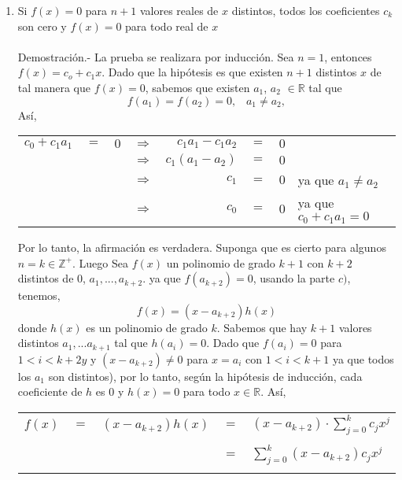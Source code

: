 \begin{enumerate}[ \bfseries 1.]
\begin{enumerate}[\bfseries (a)]
                \item Si $f(x)=0$ para $n+1$ valores reales de $x$ distintos, todos los coeficientes $c_k$ son cero y $f(x)=0$ para todo real de $x$\\\\
                Demostración.- \;  La prueba se realizara por inducción. Sea $n=1$, entonces $f(x)=c_o + c_1 x$. Dado que la hipótesis es que existen $n+1$ distintos  $x$ de tal manera que $f(x)=0$, sabemos que existen $a_1$, $a_2$ $\in \mathbb{R}$ tal que $$f(a_1)=f(a_2)=0, \; \; \; a_1 \neq a_2,$$ Así, 
                    \begin{center}
                        \begin{tabular}{r c l c r c l l}
                            $c_0 + c_1 a_1$&$=$&$0$&$\Rightarrow$&$c_1 a_1 - c_1 a_2$&$=$&$0$&\\
                            &&&$\Rightarrow$&$c_1(a_1 - a_2)$&$=$&$0$&\\
                            &&&$\Rightarrow$&$c_1$&$=$&$0$& ya que $a_1 \neq a_2$\\
                            &&&$\Rightarrow$&$c_0$&$=$&$0$&ya que $c_0 + c_1 a_1 = 0$\\
                        \end{tabular}
                    \end{center}
                Por lo tanto, la afirmación es verdadera. Suponga que es cierto para algunos $n=k \in \mathbb{Z}^{+}$. Luego Sea $f(x)$ un polinomio de grado $k+1$ con $k+2$ distintos de $0$, $a_1,...,a_{k+2}.$ ya que $f(a_{k+2}) = 0$, usando la parte $c)$, tenemos, $$f(x)=(x- a_{k+2})h(x)$$
                donde $h(x)$ es un polinomio de grado $k$. Sabemos que hay $k+1$ valores distintos $a_1,... a_{k+1}$ tal que  $h(a_i) = 0.$ Dado que $f(a_i)=0$ para $1< i < k+2y$ y $(x- a_{k+2}) \neq 0$ para $x=a_i$ con $1 < i < k+1$ ya que todos los $a_1$ son distintos), por lo tanto, según la hipótesis de inducción, cada coeficiente de $h$ es $0$ y $h(x)=0$ para todo $x \in \mathbb{R}.$ Así,
                    \begin{center}
                        \begin{tabular}{r c r c l}
                            $f(x)$&$=$&$(x - a_{k+2})h(x)$&$=$&$(x- a_{k+2}) \cdot \displaystyle\sum_{j=0}^k c_j x^j$\\\\
                            &&&$=$&$\displaystyle\sum_{j=0}^k (x - a_{k+2})c_j x^j$\\\\

\end{tabular}
\end{center}
\end{enumerate}
\end{enumerate}
